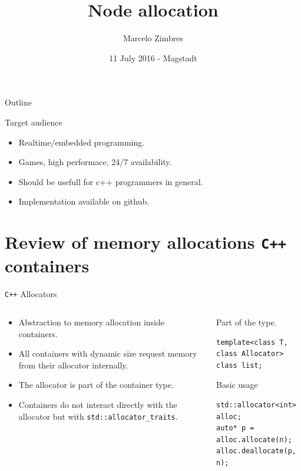 \documentclass[10pt,aspectratio=169]{beamer}
\title[Node allocation] {Node allocation}
\subtitle
{Marcelo Zimbres}
\institute[Marcelo Zimbres - Software Developer - Physicist]
{
}
\date[11 July 2016 - Magstadt - Germany] {11 July 2016 - Magstadt}
\begin{document}
\begin{frame}
  \titlepage
\end{frame}

\begin{frame}{Outline}
  \tableofcontents[]
\end{frame}



\begin{frame}{Target audience}{}
\begin{itemize}
    \item Realtime/embedded programming.
    \item Games, high performace, 24/7 availability.
    \item Should be usefull for c++ programmers in general.
    \item Implementation available on github.
\end{itemize}
\end{frame}

\section{Review of memory allocations \texttt{C++} containers}
\begin{frame}[fragile]{\texttt{C++} Allocators}
\begin{columns}
\begin{column}{0.5\textwidth}
\begin{itemize}
\item Abstraction to memory allocation inside containers.
\item All containers with dynamic size request memory from
their allocator internally.
\item The allocator is part of the container type.
\item Containers do not interact directly with the allocator but with
\texttt{std::allocator\_traits}.
\end{itemize}
\end{column}

\begin{column}{0.5\textwidth}
Part of the type.
\begin{lstlisting}
template<class T, class Allocator>
class list;
\end{lstlisting}

Basic usage
\begin{lstlisting}
std::allocator<int> alloc;
auto* p = alloc.allocate(n);
alloc.deallocate(p, n);
\end{lstlisting}
\end{column}
\end{columns}
\end{frame}
\end{document}
